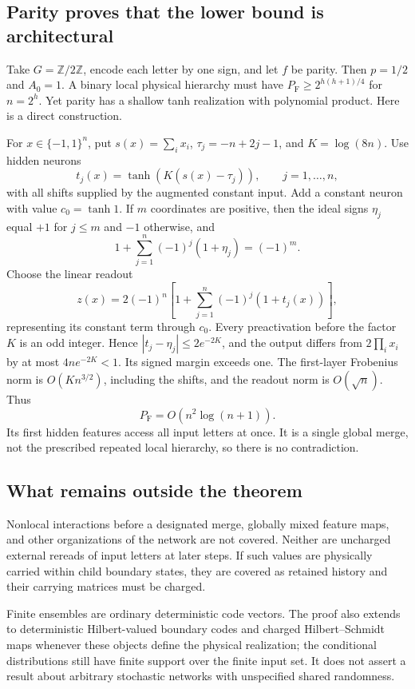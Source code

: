 \documentclass[11pt]{article}
\theoremstyle{remark}\newtheorem{remark}[theorem]{Remark}
\newcommand{\PF}{P_{\mathrm F}}
\begin{document}
\subsection{Parity proves that the lower bound is architectural}

Take $G=\mathbb Z/2\mathbb Z$, encode each letter by one sign, and let $f$
be parity. Then $p=1/2$ and $A_0=1$. A binary local physical hierarchy must
have $\PF\ge2^{h(h+1)/4}$ for $n=2^h$. Yet parity has a shallow tanh
realization with polynomial product. Here is a direct construction.

For $x\in\{-1,1\}^n$, put $s(x)=\sum_i x_i$,
$\tau_j=-n+2j-1$, and $K=\log(8n)$. Use hidden neurons
\[
 t_j(x)=\tanh(K(s(x)-\tau_j)),\qquad j=1,\ldots,n,
\]
with all shifts supplied by the augmented constant input. Add a constant
neuron with value $c_0=\tanh1$. If $m$ coordinates are positive, then the
ideal signs $\eta_j$ equal $+1$ for $j\le m$ and $-1$ otherwise, and
\[
 1+\sum_{j=1}^n(-1)^j(1+\eta_j)=(-1)^m.
\]
Choose the linear readout
\[
 z(x)=2(-1)^n\left[1+\sum_{j=1}^n(-1)^j(1+t_j(x))\right],
\]
representing its constant term through $c_0$. Every preactivation before the
factor $K$ is an odd integer. Hence
$|t_j-\eta_j|\le2e^{-2K}$, and the output differs from
$2\prod_i x_i$ by at most $4ne^{-2K}<1$. Its signed margin exceeds one.
The first-layer Frobenius norm is $O(Kn^{3/2})$, including the shifts, and
the readout norm is $O(\sqrt n)$. Thus
\[
 \PF=O(n^2\log(n+1)).
\]
Its first hidden features access all input letters at once. It is a single
global merge, not the prescribed repeated local hierarchy, so there is no
contradiction.

\subsection{What remains outside the theorem}

Nonlocal interactions before a designated merge, globally mixed feature maps,
and other organizations of the network are not covered. Neither are
uncharged external rereads of input letters at later steps. If such values
are physically carried within child boundary states, they are covered as
retained history and their carrying matrices must be charged.

Finite ensembles are ordinary deterministic code vectors. The proof also
extends to deterministic Hilbert-valued boundary codes and charged
Hilbert--Schmidt maps whenever these objects define the physical realization;
the conditional distributions still have finite support over the finite input
set. It does not assert a result about arbitrary stochastic networks with
unspecified shared randomness.
\end{document}

